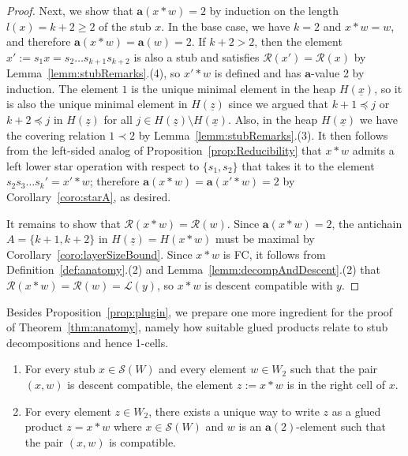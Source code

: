 \documentclass[ALCO,Unicode,published]{cedram}
\newcommand{\call}{\mathcal{L}}
\newcommand{\calr}{\mathcal{R}}
\newcommand{\la}{\mathbf{a}}
\newcommand{\sw}{\mathcal{S}(W)}
\newcommand{\ul}{\underline}
\begin{document}
\begin{proof}
    Next, we show that $\la(x*w)=2$ by induction on the length $l(x)=k+2\ge 2$ of the stub $x$. In
    the base case, we have $k=2$ and $x*w=w$, and therefore $\la(x*w)=\la(w)=2$. If $k+2>2$, then
    the element $x':=s_1x=s_2\dots s_{k+1}s_{k+2}$ is also a stub and satisfies $\calr(x')=\calr(x)$
    by Lemma~\ref{lemm:stubRemarks}.(4), so $x'*w$ is defined and has $\la$-value 2 by induction. The
    element $1$ is the unique minimal element in the heap $H(\ul x)$, so it is also the unique
    minimal element in $H(\ul z)$ since we argued that $k+1\preceq j$ or $k+2\preceq j$ in $H(\ul
    z)$ for all $j\in H(\ul z)\setminus H(\ul x)$. Also, in the heap $H(\ul x)$ we have the covering
    relation $1\prec 2$ by Lemma~\ref{lemm:stubRemarks}.(3). It then follows from the left-sided analog
    of Proposition~\ref{prop:Reducibility} that $x*w$ admits a left lower star operation with respect to
    $\{s_1,s_2\}$ that takes it to the element $s_2s_3\dots s_k'=x'*w$; therefore
    $\la(x*w)=\la(x'*w)=2$ by Corollary~\ref{coro:starA}, as desired. 

    It remains to show that $\calr(x*w)=\calr(w)$. Since $\la(x*w)=2$, the antichain $A=\{k+1,k+2\}$
    in $H(\ul z)=H(x*w)$ must be maximal by Corollary~\ref{coro:layerSizeBound}. Since $x*w$ is FC, it
    follows from Definition~\ref{def:anatomy}.(2) and Lemma~\ref{lemm:decompAndDescent}.(2) that
    $\calr(x*w)=\calr(w)=\call(y)$, so $x*w$ is descent compatible with $y$.
\end{proof}

Besides Proposition~\ref{prop:plugin}, we prepare one more ingredient for the proof of Theorem~\ref{thm:anatomy},
namely how suitable glued products relate to stub decompositions and hence 1-cells. 

\begin{prop}
    \label{prop:glueAndCells}
      \begin{enumerate}
          \item For every stub $x\in \sw$ and every element $w\in W_2$ such that the pair $(x,w)$ is descent
              compatible, the element $z:=x*w$ is in the right cell of $x$.
        \item For every element $z\in W_2$, there exists a unique way to write $z$ as a glued product $z=x*w$ where
             $x\in \sw$ and $w$ is an $\la(2)$-element such that the pair $(x,w)$ is compatible.
    \end{enumerate}
\end{prop}
\end{document}
